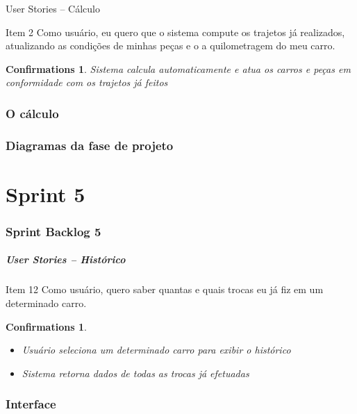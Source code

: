 \documentclass[hyperref={pdfpagelabels=false},11pt]{beamer}
\newtheorem{confirmations}[theorem]{Confirmations}
\begin{document}
			\begin{frame}{User Stories -- Cálculo}
				\begin{block}{Item 2}
					Como usuário, eu quero que o sistema compute os trajetos já realizados, atualizando as condições de minhas peças e o a quilometragem do meu carro.
					\begin{confirmations}
						Sistema calcula automaticamente e atua os carros e peças em conformidade com os trajetos já feitos
					\end{confirmations}
				\end{block}
			\end{frame}
			
			
				 		
 		
		\section{O cálculo}
		\section{Diagramas da fase de projeto}
	\part{Sprint 5}
		\section{Sprint Backlog 5}
			\begin{frame}
				\frametitle{User Stories -- Histórico}
				\begin{block}{Item 12}
					Como usuário, quero saber quantas e quais trocas eu já fiz em um determinado carro.
					\begin{confirmations}
						\begin{itemize}
							\item{Usuário seleciona um determinado carro para exibir o histórico}
							\item{Sistema retorna dados de todas as trocas já efetuadas}
						\end{itemize}
					\end{confirmations}
				\end{block}
			\end{frame}		
		
		\section{Interface}
\end{document}
